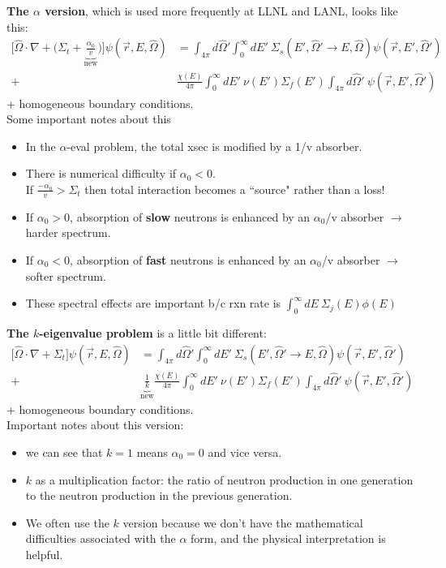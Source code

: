 \documentclass[12pt]{article}
\newcommand{\vOmega}{\ensuremath{\hat{\Omega}}}
\begin{document}
\textbf{The $\alpha$ version}, which is used more frequently at LLNL and LANL, looks like this:
%
\begin{align*}
\bigl[\vOmega \cdot \nabla + \bigl(\Sigma_t + \underbrace{\frac{\alpha_0}{v}}_{\text{new}}\bigr)\bigr]\psi(\vec{r}, E, \vOmega) &= \int_{4 \pi} d\vOmega' \int_0^{\infty} dE' \: \Sigma_s(E', \vOmega' \rightarrow E, \vOmega) \psi(\vec{r}, E', \vOmega')\\
 +& \frac{\chi(E)}{4 \pi}\int_0^{\infty} dE' \: \nu(E') \Sigma_f(E') \int_{4 \pi} d\vOmega' \:\psi(\vec{r}, E', \vOmega')
\end{align*}
+ homogeneous boundary conditions.\\
%
Some important notes about this
\begin{itemize}
\item In the $\alpha$-eval problem, the total xsec is modified by a 1/v absorber.
\item There is numerical difficulty if $\alpha_0 < 0$.\\
If $\frac{-\alpha_0}{v} > \Sigma_t$ then total interaction becomes a ``source" rather than a loss!
\item If $\alpha_0 > 0$, absorption of \textbf{slow} neutrons is enhanced by an $\alpha_0$/v absorber $\rightarrow$ harder spectrum.
\item If $\alpha_0 < 0$, absorption of \textbf{fast} neutrons is enhanced by an $\alpha_0$/v absorber $\rightarrow$ softer spectrum.
\item These spectral effects are important b/c rxn rate is $\int_0^{\infty} dE \:\Sigma_j(E) \phi(E)$
\end{itemize}

\textbf{The $k$-eigenvalue problem} is a little bit different:
%
\begin{align*}
\bigl[\vOmega \cdot \nabla + \Sigma_t \bigr]\psi(\vec{r}, E, \vOmega) &= \int_{4 \pi} d\vOmega' \int_0^{\infty} dE' \: \Sigma_s(E', \vOmega' \rightarrow E, \vOmega) \psi(\vec{r}, E', \vOmega')\\
 +& \underbrace{\frac{1}{k}}_{\text{new}}\frac{\chi(E)}{4 \pi}\int_0^{\infty} dE' \: \nu(E') \Sigma_f(E') \int_{4 \pi} d\vOmega' \:\psi(\vec{r}, E', \vOmega')
\end{align*}
%
+ homogeneous boundary conditions.\\
Important notes about this version:
\begin{itemize}
\item we can see that $k=1$ means $\alpha_0 = 0$ and vice versa.
\item $k$ as a multiplication factor: the ratio of neutron production in one generation to the neutron production in the previous generation.
\item We often use the $k$ version because we don't have the mathematical difficulties associated with the $\alpha$ form, and the physical interpretation is helpful.
\end{itemize}
\end{document}
